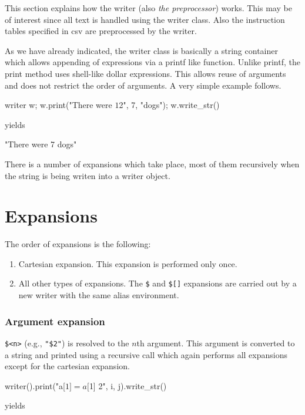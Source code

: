 This section explains how the writer (also \emph{the preprocessor}) works. This may be of interest since all text is handled using the writer class. Also the instruction tables specified in csv are preprocessed by the writer.

As we have already indicated, the writer class is basically a string container which allows appending of expressions via a printf like function. Unlike printf, the print method uses shell-like dollar expressions. This allows reuse of arguments and does not restrict the order of arguments. A very simple example follows.

\mybeginfig
\begin{code}
writer w;
w.print("There were $1 $2", 7, "dogs");
w.write_str()
\end{code}
yields
\begin{code}
"There were 7 dogs"
\end{code}

There is a number of expansions which take place, most of them recursively when the string is being writen into a writer object.

\section*{Expansions}

The order of expansions is the following:
\begin{enumerate}
\item Cartesian expansion. This expansion is performed only once.
\item All other types of expansions. The \texttt{\$\string{\string}} and \texttt{\$[]} expansions are carried out by a new writer with the same alias environment.
\end{enumerate}

\subsubsection{Argument expansion}

\texttt{\$<n>} (e.g., \texttt{"\$2"}) is resolved to the $n$th argument. This argument is converted to a string and printed using a recursive call which again performs all expansions except for the cartesian expansion.

\mybeginfig
\begin{code}
writer().print("a[$1] = a[$1] $ $2", i, j).write_str()
\end{code}
yields

